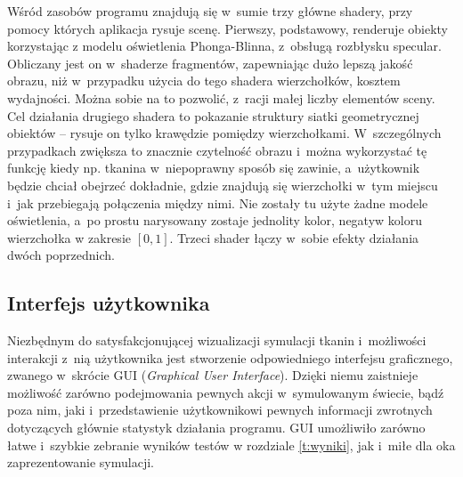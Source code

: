 		Wśród zasobów programu znajdują się w~sumie trzy główne shadery, przy pomocy których aplikacja rysuje scenę. Pierwszy, podstawowy, renderuje obiekty korzystając z modelu oświetlenia Phonga-Blinna, z~obsługą rozbłysku specular. Obliczany jest on w~shaderze fragmentów, zapewniając dużo lepszą jakość obrazu, niż w~przypadku użycia do tego shadera wierzchołków, kosztem wydajności. Można sobie na to pozwolić, z~racji małej liczby elementów sceny. Cel działania drugiego shadera to pokazanie struktury siatki geometrycznej obiektów -- rysuje on tylko krawędzie pomiędzy wierzchołkami. W~szczególnych przypadkach zwiększa to znacznie czytelność obrazu i~można wykorzystać tę funkcję kiedy np. tkanina w~niepoprawny sposób się zawinie, a~użytkownik będzie chciał obejrzeć dokładnie, gdzie znajdują się wierzchołki w~tym miejscu i~jak przebiegają połączenia między nimi. Nie zostały tu użyte żadne modele oświetlenia, a~po prostu narysowany zostaje jednolity kolor, negatyw koloru wierzchołka w zakresie \([0, 1]\). Trzeci shader łączy w~sobie efekty działania dwóch poprzednich.
		
		\subsection{Interfejs użytkownika}
		\label{t:praktyka:silnik:gui}
		
		
		Niezbędnym do satysfakcjonującej wizualizacji symulacji tkanin i~możliwości interakcji z~nią użytkownika jest stworzenie odpowiedniego interfejsu graficznego, zwanego w~skrócie GUI (\emph{Graphical User Interface}). Dzięki niemu zaistnieje możliwość zarówno podejmowania pewnych akcji w~symulowanym świecie, bądź poza nim, jaki i~przedstawienie użytkownikowi pewnych informacji zwrotnych dotyczących głównie statystyk działania programu. GUI umożliwiło zarówno łatwe i~szybkie zebranie wyników testów w rozdziale \ref{t:wyniki}, jak i~miłe dla oka zaprezentowanie symulacji.
		
